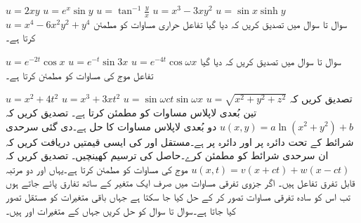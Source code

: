  \quad
$u=2xy$
 \quad
$u=e^x\sin y$
 \quad
$u=\tan^{-1}\frac{y}{x}$
 \quad
$u=x^3-3xy^2$
 \quad
$u=\sin x\sinh y$
 \quad
$u=x^4-6x^2y^2+y^4$
سوال  تا سوال  میں تصدیق کریں کہ دیا گیا تفاعل حراری مساوات  کو مطمئن کرتا ہے۔

 \quad
$u=e^{-2t}\cos x$
\quad
$u=e^{-t}\sin 3x$
\quad
$u=e^{-4t}\cos \omega x$
سوال  تا سوال  میں تصدیق کریں کہ دیا گیا تفاعل موج کی مساوات  کو مطمئن کرتا ہے۔

\quad
$u=x^2+4t^2$
\quad
$u=x^3+3xt^2$
\quad
$u=\sin \omega ct\sin \omega x$
\quad
تصدیق کریں کہ 
$u=\sqrt{x^2+y^2+z^2}$
تین بُعدی لاپلاس مساوات  کو مطمئن کرتا ہے۔
\quad
تصدیق کریں کہ
$u(x,y)=a\ln(x^2+y^2)+b$
دو بُعدی لاپلاس مساوات  کا حل ہے۔دی گئی سرحدی شرائط کے تحت دائرہ  پر   اور دائرہ  پر  ہے۔مستقل  اور  کی ایسی قیمتیں دریافت کریں کہ  ان سرحدی شرائط کو مطمئن کرے۔حاصل  کی ترسیم کھینچیں۔
\quad
تصدیق کریں کہ
$u(x,t)=v(x+ct)+w(x-ct)$
موج کی مساوات  کو مطمئن کرتا ہے۔یہاں  اور  دو مرتبہ قابل تفرق تفاعل ہیں۔
اگر جزوی تفرقی مساوات میں صرف ایک متغیر کے ساتھ تفارق پائے جاتے ہوں تب اس کو سادہ تفرقی مساوات تصور کر کے حل کیا جا سکتا ہے جہاں باقی متغیرات کو مستقل تصور کیا جاتا ہے۔سوال  تا سوال  کو حل کریں جہاں  کے متغیرات  اور  ہیں۔

